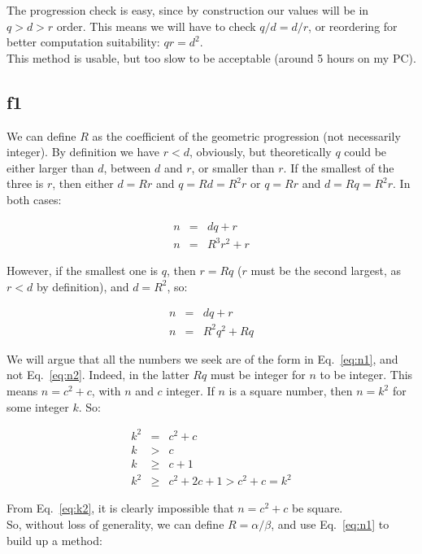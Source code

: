 \documentclass[english]{article}
\begin{document}
The progression check is easy, since by construction our values will be in $q > d > r$ order. This means we will have to check $q/d = d/r$, or reordering for better computation suitability: $q r = d^2$.\\

This method is usable, but too slow to be acceptable (around 5 hours on my PC).

\subsection{f1}

We can define $R$ as the coefficient of the geometric progression (not necessarily integer). By definition we have $r < d$, obviously, but theoretically $q$ could be either larger than $d$, between $d$ and $r$, or smaller than $r$. If the smallest of the three is $r$, then either $d = R r$ and $q = R d = R^2 r$ or $q = R r$ and $d = R q = R^2 r$. In both cases:

\begin{eqnarray}
n & = & d q + r\\
n & = & R^3 r^2 + r \label{eq:n1}
\end{eqnarray}

However, if the smallest one is $q$, then $r = Rq$ ($r$ must be the second largest, as $r < d$ by definition), and $d = R^2$, so:

\begin{eqnarray}
n & = & d q + r\\
n & = & R^2 q^2 + Rq \label{eq:n2}
\end{eqnarray}

We will argue that all the numbers we seek are of the form in Eq.~\ref{eq:n1}, and not Eq.~\ref{eq:n2}. Indeed, in the latter $Rq$ must be integer for $n$ to be integer. This means $n = c^2 + c$, with $n$ and $c$ integer. If $n$ is a square number, then $n = k^2$ for some integer $k$. So:

\begin{eqnarray}
k^2 & =  & c^2 + c \\
k & >  & c \\
k & \geq & c + 1 \\
k^2 & \geq & c^2 + 2c + 1 > c^2 + c = k^2 \label{eq:k2}
\end{eqnarray}

From Eq.~\ref{eq:k2}, it is clearly impossible that $n = c^2 + c$ be square.\\

So, without loss of generality, we can define $R = \alpha/\beta$, and use Eq.~\ref{eq:n1} to build up a method: 
\end{document}
